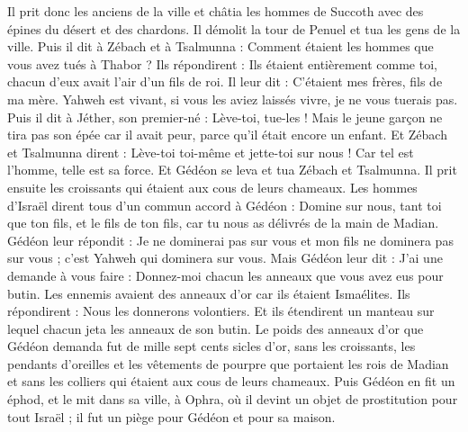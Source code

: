 \begin{multicols}{2}
Il prit donc les anciens de la ville et châtia les hommes de Succoth avec des épines du désert et des chardons.
Il démolit la tour de Penuel et tua les gens de la ville.
Puis il dit à Zébach et à Tsalmunna : Comment étaient les hommes que vous avez tués à Thabor ? Ils répondirent : Ils étaient entièrement comme toi, chacun d'eux avait l'air d'un fils de roi.
Il leur dit : C'étaient mes frères, fils de ma mère. Yahweh est vivant, si vous les aviez laissés vivre, je ne vous tuerais pas.
Puis il dit à Jéther, son premier-né : Lève-toi, tue-les ! Mais le jeune garçon ne tira pas son épée car il avait peur, parce qu'il était encore un enfant.
Et Zébach et Tsalmunna dirent : Lève-toi toi-même et jette-toi sur nous ! Car tel est l'homme, telle est sa force. Et Gédéon se leva et tua Zébach et Tsalmunna. Il prit ensuite les croissants qui étaient aux cous de leurs chameaux.
Les hommes d'Israël dirent tous d'un commun accord à Gédéon : Domine sur nous, tant toi que ton fils, et le fils de ton fils, car tu nous as délivrés de la main de Madian.
Gédéon leur répondit : Je ne dominerai pas sur vous et mon fils ne dominera pas sur vous ; c'est Yahweh qui dominera sur vous.
Mais Gédéon leur dit : J'ai une demande à vous faire : Donnez-moi chacun les anneaux que vous avez eus pour butin. Les ennemis avaient des anneaux d'or car ils étaient Ismaélites.
Ils répondirent : Nous les donnerons volontiers. Et ils étendirent un manteau sur lequel chacun jeta les anneaux de son butin.
Le poids des anneaux d'or que Gédéon demanda fut de mille sept cents sicles d'or, sans les croissants, les pendants d'oreilles et les vêtements de pourpre que portaient les rois de Madian et sans les colliers qui étaient aux cous de leurs chameaux.
Puis Gédéon en fit un éphod, et le mit dans sa ville, à Ophra, où il devint un objet de prostitution pour tout Israël ; il fut un piège pour Gédéon et pour sa maison.

\end{multicols}
